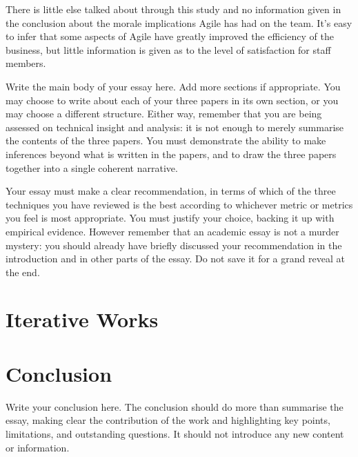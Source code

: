 \documentclass{scrartcl}
\begin{document}
There is little else talked about through this study and no information given in the conclusion about the morale implications Agile has had on the team. It's easy to infer that some aspects of Agile have greatly improved the efficiency of the business, but little information is given as to the level of satisfaction for staff members.

Write the main body of your essay here. Add more sections if appropriate. You may choose to write about each of your three papers in its own section, or you may choose a different structure. Either way, remember that you are being assessed on technical insight and analysis: it is not enough to merely summarise the contents of the three papers. You must demonstrate the ability to make inferences beyond what is written in the papers, and to draw the three papers together into a single coherent narrative.

Your essay must make a clear recommendation, in terms of which of the three techniques you have reviewed is the best according to whichever metric or metrics you feel is most appropriate. You must justify your choice, backing it up with empirical evidence. However remember that an academic essay is not a murder mystery: you should already have briefly discussed your recommendation in the introduction and in other parts of the essay. Do not save it for a grand reveal at the end.

\section{Iterative Works}


\section{Conclusion}

Write your conclusion here. The conclusion should do more than summarise the essay, making clear the contribution of the work and highlighting key points, limitations, and outstanding questions. It should not introduce any new content or information.



\end{document}
